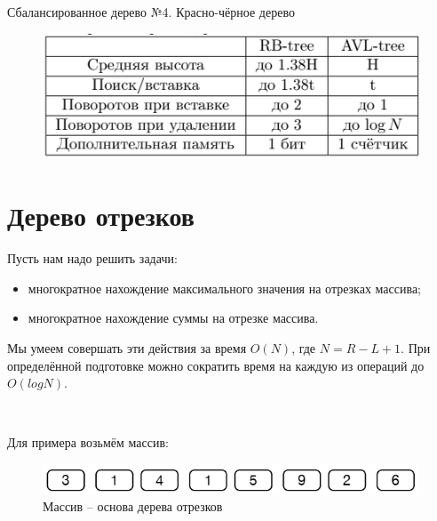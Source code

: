 \documentclass{beamer}
\begin{document}
\begin{frame}[fragile]{Сбалансированное дерево №4. Красно-чёрное дерево}
	\begin{figure}[h]
		\centering
		\includegraphics[scale=0.75]{images/lec07-pic16.png}
	\end{figure}
\end{frame}

\section{Дерево отрезков}
  
\begin{frame}
	Пусть нам надо решить задачи:
	\begin{itemize}
		\item многократное нахождение максимального значения на отрезках массива;
		\item многократное нахождение суммы на отрезке массива.
	\end{itemize}	
	Мы умеем совершать эти действия за время $O(N)$, где $N = R - L + 1$. При определённой подготовке можно сократить время на каждую из операций до $O(log N)$.

	~
	
	Для примера возьмём массив:
	\begin{figure}[h]
		\centering
		\includegraphics[scale=0.5]{images/lec07-pic17.png}
		\caption{Массив -- основа дерева отрезков}
	\end{figure}
\end{frame}	
\end{document}

